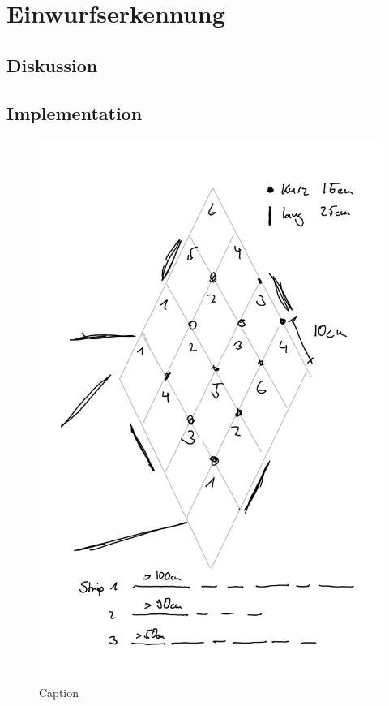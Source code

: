 \section{Einwurfserkennung}
    \subsection{Diskussion}

    \subsection{Implementation}
        
        \begin{figure}[h]
            \begin{center}
                \includegraphics[width=12cm]{media/03_technical_implementation/leds_3.png}
            \end{center}
            \caption{Caption}
            \label{fig:leds_3}
        \end{figure}


